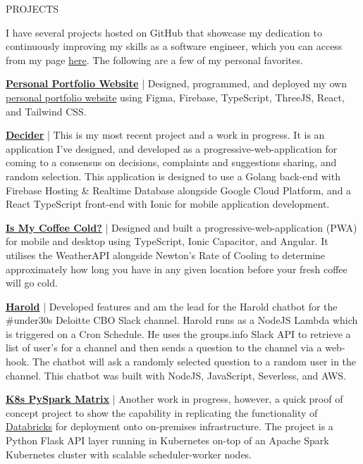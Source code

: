 \documentclass{resume} %
\begin{document}
\begin{rSection}{PROJECTS}
\vspace{-1.25em}
\item {I have several projects hosted on GitHub that showcase my dedication to continuously improving my skills as a software engineer, which you can access from my page \href{https://github.com/jamestkelly}{here}. The following are a few of my personal favorites.}
\item \textbf{\href{https://github.com/jamestkelly/personal-portfolio}{Personal Portfolio Website}} {| Designed, programmed, and deployed my own \href{https://jim-t-kelly.web.app}{personal portfolio website} using Figma, Firebase, TypeScript, ThreeJS, React, and Tailwind CSS.}
\item \textbf{\href{https://github.com/jamestkelly/decider}{Decider}} {| This is my most recent project and a work in progress. It is an application I've designed, and developed as a progressive-web-application for coming to a consensus on decisions, complaints and suggestions sharing, and random selection. This application is designed to use a Golang back-end with Firebase Hosting \& Realtime Database alongside Google Cloud Platform, and a React TypeScript front-end with Ionic for mobile application development.}
\item \textbf{\href{https://github.com/jamestkelly/is-my-coffee-cold}{Is My Coffee Cold?}} {| Designed and built a progressive-web-application (PWA) for mobile and desktop using TypeScript, Ionic Capacitor, and Angular. It utilises the WeatherAPI alongside Newton's Rate of Cooling to determine approximately how long you have in any given location before your fresh coffee will go cold.}
\item \textbf{\href{https://github.com/jamestkelly/harold}{Harold}} {| Developed features and am the lead for the Harold chatbot for the \#under30s Deloitte CBO Slack channel. Harold runs as a NodeJS Lambda which is triggered on a Cron Schedule. He uses the groups.info Slack API to retrieve a list of user's for a channel and then sends a question to the channel via a web-hook. The chatbot will ask a randomly selected question to a random user in the channel. This chatbot was built with NodeJS, JavaScript, Severless, and AWS.}
\item \textbf{\href{https://github.com/jamestkelly/K8s-PySpark-Matrix}{K8s PySpark Matrix}} {| Another work in progress, however, a quick proof of concept project to show the capability in replicating the functionality of \href{https://www.google.com/url?sa=t&rct=j&q=&esrc=s&source=web&cd=&cad=rja&uact=8&ved=2ahUKEwiFp-Wipuj_AhVjhVYBHS5kAJQQFnoECA8QAQ&url=https%3A%2F%2Fwww.databricks.com%2F&usg=AOvVaw2NlAEgQTHRQSQHUTnso27O&opi=89978449}{Databricks} for deployment onto on-premises infrastructure. The project is a Python Flask API layer running in Kubernetes on-top of an Apache Spark Kubernetes cluster with scalable scheduler-worker nodes.}

\end{rSection}
\end{document}
